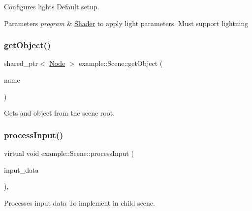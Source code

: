 Configures lights Default setup. 


\begin{DoxyParams}{Parameters}
{\em program} & \mbox{\hyperlink{classexample_1_1_shader}{Shader}} to apply light parameters. Must support lightning \\
\hline
\end{DoxyParams}
\mbox{\label{classexample_1_1_scene_a8636f5257b9514898b6f57a0161c3169}} 
\subsubsection{\texorpdfstring{get\+Object()}{getObject()}}
{\footnotesize\ttfamily shared\+\_\+ptr$<$ \mbox{\hyperlink{classexample_1_1_node}{Node}} $>$ example\+::\+Scene\+::get\+Object (\begin{DoxyParamCaption}\item[{string}]{name }\end{DoxyParamCaption})\hspace{0.3cm}{\ttfamily [inline]}}



Gets and object from the scene root. 

\mbox{\label{classexample_1_1_scene_a798a6c155c57e9368b72014795a64d77}} 
\subsubsection{\texorpdfstring{process\+Input()}{processInput()}}
{\footnotesize\ttfamily virtual void example\+::\+Scene\+::process\+Input (\begin{DoxyParamCaption}\item[{\mbox{\hyperlink{classexample_1_1_input_af6bf4fd763ca01bd106ca3b03f162e3d}{Input\+::\+Input\+Data}}}]{input\+\_\+data }\end{DoxyParamCaption})\hspace{0.3cm}{\ttfamily [inline]}, {\ttfamily [virtual]}}



Processes input data To implement in child scene. 



